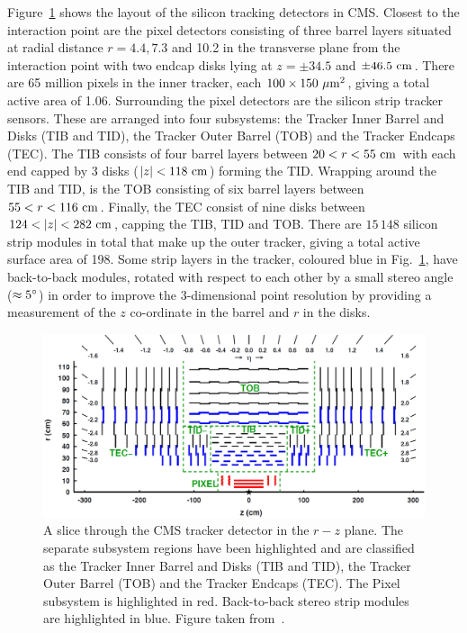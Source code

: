 Figure~\ref{fig:CMSTracker} shows the layout of the silicon tracking detectors in CMS. 
Closest to the interaction point are the pixel detectors consisting of three barrel layers situated at radial distance $r=4.4, 7.3$ and 10.2\cm{} in the transverse plane from the interaction point with two endcap disks lying at $z=\pm34.5$ and $\pm46.5\mathrm{~cm}^{}$.  
There are 65 million pixels in the inner tracker, each $100\times150\mathrm{~\mu m}^{2}$, giving a total active area of 1.06\msq{}.
Surrounding the pixel detectors are the silicon strip tracker sensors. 
These are arranged into four subsystems: the Tracker Inner Barrel and Disks (TIB and TID), the Tracker Outer Barrel (TOB) and the Tracker Endcaps (TEC).
The TIB consists of four barrel layers between $20<r<55\mathrm{~cm}^{}$ with each end capped by 3 disks ($|z|<118\mathrm{~cm}^{}$) forming the TID. 
Wrapping around the TIB and TID, is the TOB consisting of six barrel layers between $55<r<116\mathrm{~cm}^{}$. 
Finally, the TEC consist of nine disks between $124<|z|<282\cm$, capping the TIB, TID and TOB.
There are $15\,148$ silicon strip modules in total that make up the outer tracker, giving a total active surface area of 198\msq{}. 
Some strip layers in the tracker, coloured blue in Fig.~\ref{fig:CMSTracker}, have back-to-back modules, rotated with respect to each other by a small stereo angle ($\approx5^\circ$) in order to improve the 3-dimensional point resolution by providing a measurement of the $z$ co-ordinate in the barrel and $r$ in the disks.

\begin{figure}[htpb]
	\centering
	\includegraphics[width=\textwidth]{Figures/CMSTracker2.jpg}
	\caption[A slice through the CMS tracker detector in the $r-z$ plane. The separate subsystem regions have been highlighted and are classified as the Tracker Inner Barrel and Disks (TIB and TID), the Tracker Outer Barrel (TOB) and the Tracker Endcaps (TEC). The Pixel subsystem is highlighted in red. Back-to-back stereo strip modules are highlighted in blue.]{A slice through the CMS tracker detector in the $r-z$ plane. The separate subsystem regions have been highlighted and are classified as the Tracker Inner Barrel and Disks (TIB and TID), the Tracker Outer Barrel (TOB) and the Tracker Endcaps (TEC). The Pixel subsystem is highlighted in red. Back-to-back stereo strip modules are highlighted in blue. Figure taken from~\cite{CMSTrackerPerformance}.}
	\label{fig:CMSTracker}
\end{figure}

